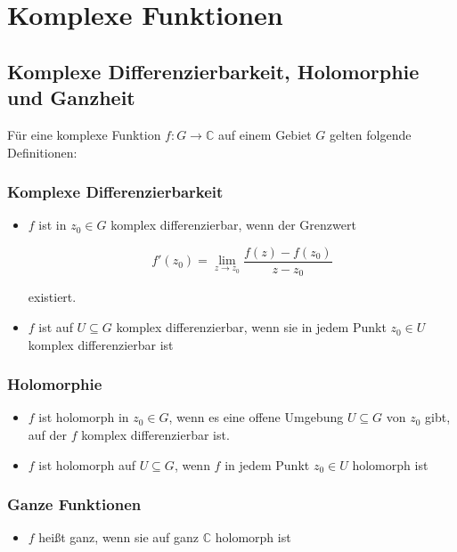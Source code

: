 \documentclass[a4paper,11pt,oneside,open=any,parskip=half, DIV=15]{scrreprt}
\begin{document}
\chapter{Komplexe Funktionen}

\section{Komplexe Differenzierbarkeit, Holomorphie und Ganzheit}

   Für eine komplexe Funktion \( f : G \to \mathbb{C} \) auf einem Gebiet \( G \) gelten folgende Definitionen:

   \subsection*{Komplexe Differenzierbarkeit}
      \begin{itemize}
         \item \( f \) ist in \( z_0 \in G \) komplex differenzierbar, wenn der Grenzwert
         \begin{importantbox}
            \[
               f'(z_0) = \lim_{z \to z_0} \frac{f(z) - f(z_0)}{z - z_0}
            \]
         \end{importantbox}

         existiert.

         \item \( f \) ist auf \( U \subseteq G \) komplex differenzierbar, wenn sie in jedem Punkt \( z_0 \in U \) komplex differenzierbar ist
      \end{itemize}

   \subsection*{Holomorphie}
      \begin{itemize}
         \item \( f \) ist holomorph in \( z_0 \in G \), wenn es eine offene Umgebung \( U \subseteq G \) von \( z_0 \) gibt, auf der \( f \) komplex differenzierbar ist.

         \item \( f \) ist holomorph auf \( U \subseteq G \), wenn \( f \) in jedem Punkt \( z_0 \in U \) holomorph ist
      \end{itemize}

   \subsection*{Ganze Funktionen}
      \begin{itemize}
         \item \( f \) heißt ganz, wenn sie auf ganz \( \mathbb{C} \) holomorph ist
      \end{itemize}
\end{document}
